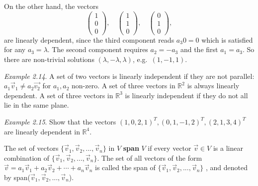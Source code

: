 \documentclass[
  letterpaper,
  DIV=11,
  numbers=noendperiod]{scrartcl}
\theoremstyle{remark}
\newenvironment{fbxSimple}[3]{\begin{tcolorbox}[enhanced, breakable,%
attach boxed title to top*={xshift=1.4pt},
boxed title style={boxrule=0.0mm, fuzzy shadow={1pt}{-1pt}{0mm}{0.1mm}{gray}, arc=.3em, rounded corners=east, sharp corners=west}, colframe=#1-color2, colbacktitle=#1-color1, colback = white, coltitle=black,  titlerule=0mm, toprule=0pt, bottomrule=.7pt, leftrule=.3em, rightrule=.7pt, outer arc=.3em,  	left=.5em, right=.5em, bottomtitle=1mm, toptitle=1mm,title=\textbf{#2}\hspace{0.5em}{#3}]}
{\end{tcolorbox}}
\begin{document}
On the other hand, the vectors
\[\scriptstyle \begin{pmatrix}   1 \\ 0 \\ 0  \end{pmatrix} \textstyle, \quad \scriptstyle \begin{pmatrix}   1 \\ 1 \\ 0  \end{pmatrix} \textstyle,  \quad \scriptstyle \begin{pmatrix}   0 \\ 1 \\ 0  \end{pmatrix} \textstyle,\]
are linearly dependent, since the third component reads \(a_{3} 0 = 0\)
which is satisfied for any \(a_{3}=\lambda\). The second component
requires \(a_{2} = - a_{3}\) and the first \(a_{1} = a_{3}\). So there
are non-trivial solutions \((\lambda , -\lambda , \lambda )\),
e.g.~\((1,-1,1)\).

\emph{Example 2.14}. A set of two vectors is linearly independent if
they are not parallel: \(a_{1} \vec{v}_{1} \neq a_{2} \vec{v_{2}}\) for
\(a_{1}, a_{2}\) non-zero. A set of three vectors in \(\mathbb{R}^{2}\)
is always linearly dependent. A set of three vectors in
\(\mathbb{R}^{3}\) is linearly independent if they do not all lie in the
same plane.

\emph{Example 2.15}. Show that the vectors
\((1,0,2,1)^{T},(0,1,-1,2)^{T},(2,1,3,4)^{T}\) are linearly dependent in
\(\mathbb{R}^{4}.\)

\label{span}
\begin{fbxSimple}{Definition}{Definition 5: }{Span}
\label{span}
The set of vectors \(\{{\vec v}_{1},{\vec v}_{2},...,{\vec v}_{n}\}\) in
\(V\) \textbf{span} \(V\) if every vector \(\vec{v}\in V\) is a linear
combination of \(\{{\vec v}_{1},{\vec v}_{2},...,{\vec v}_{n}\}\). The
set of all vectors of the form
\({\vec v=}a_{1}{\vec v}_{1}+a_{2}{\vec v}_{2}+\cdots +a_{n}{\vec v}_{n}\)
is called the span of \(\{{\vec v}_{1},{\vec v}_{2},...,{\vec v}_{n}\}\)
, and denoted by span(\({\vec v}_{1},{\vec v}_{2},...,{\vec v}_{n}\)).

\end{fbxSimple}
\end{document}
